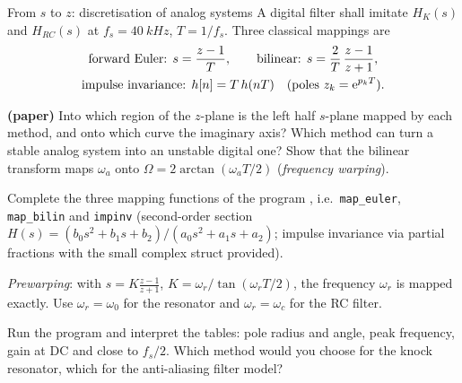 \begin{exercise}{From $s$ to $z$: discretisation of analog systems}{\JSLinux}
A digital filter shall imitate $H_K(s)$ and $H_{RC}(s)$ at $f_s=\SI{40}{kHz}$,
$T=1/f_s$. Three classical mappings are
\begin{gather*}
  \text{forward Euler: } s=\frac{z-1}{T},\qquad
  \text{bilinear: } s=\frac2T\,\frac{z-1}{z+1},\\
  \text{impulse invariance: } h[n]=T\,h(nT)\quad(\text{poles } z_k=\mathrm{e}^{p_kT}).
\end{gather*}
\begin{tasks}
  \item \textbf{(paper)} Into which region of the $z$-plane is the left half
    $s$-plane mapped by each method, and onto which curve the imaginary axis?
    Which method can turn a stable analog system into an unstable digital one?
    Show that the bilinear transform maps $\omega_a$ onto
    $\Omega=2\arctan(\omega_aT/2)$ (\emph{frequency warping}).
  \item Complete the three mapping functions of the program
    , i.e.\ \texttt{map\_euler},
    \texttt{map\_bilin} and \texttt{impinv} (second-order section $H(s)=(b_0s^2+b_1s+b_2)/(a_0s^2+a_1s+a_2)$; impulse
    invariance via partial fractions with the small complex struct provided).
  \item \emph{Prewarping}: with $s=K\frac{z-1}{z+1}$,
    $K=\omega_r/\tan(\omega_rT/2)$, the frequency $\omega_r$ is mapped exactly.
    Use $\omega_r=\omega_0$ for the resonator and $\omega_r=\omega_c$ for the RC
    filter.
  \item Run the program and interpret the tables: pole radius and angle, peak
    frequency, gain at DC and close to $f_s/2$. Which method would you choose
    for the knock resonator, which for the anti-aliasing filter model?
\end{tasks}
\end{exercise}


